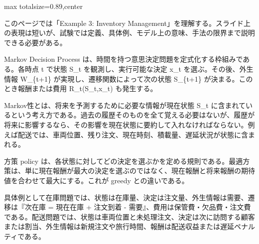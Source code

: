 \begin{minipage}[t]{0.58\textwidth}
\begin{adjustbox}{max totalsize={\textwidth}{0.89\textheight},center}
\begin{minipage}{\textwidth}\scriptsize
{}このページでは「Example 3: Inventory Management」を理解する。スライド上の表現は短いが、試験では定義、具体例、モデル上の意味、手法の限界まで説明できる必要がある。\par
Markov Decision Process は、時間を持つ意思決定問題を定式化する枠組みである。各時点 t で状態 S\_t を観測し、実行可能な決定 x\_t を選ぶ。その後、外生情報 W\_\{t+1\} が実現し、遷移関数によって次の状態 S\_\{t+1\} が決まる。このとき報酬または費用 R\_t(S\_t,x\_t) も発生する。\par
Markov性とは、将来を予測するために必要な情報が現在状態 S\_t に含まれているという考え方である。過去の履歴そのものを全て覚える必要はないが、履歴が将来に影響するなら、その影響を現在状態に要約して入れなければならない。例えば配送では、車両位置、残り注文、現在時刻、積載量、遅延状況が状態に含まれる。\par
方策 policy は、各状態に対してどの決定を選ぶかを定める規則である。最適方策は、単に現在報酬が最大の決定を選ぶのではなく、現在報酬と将来報酬の期待値を合わせて最大にする。これが greedy との違いである。\par
具体例として在庫問題では、状態は在庫量、決定は注文量、外生情報は需要、遷移は『次在庫 = 現在在庫 + 注文到着 - 需要』、費用は保管費・欠品費・注文費である。配送問題では、状態は車両位置と未処理注文、決定は次に訪問する顧客または割当、外生情報は新規注文や旅行時間、報酬は配送収益または遅延ペナルティである。\par

\end{minipage}
\end{adjustbox}
\end{minipage}
